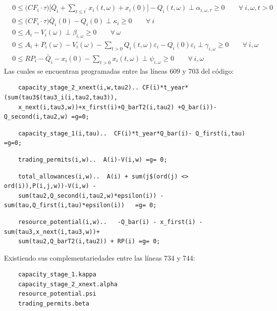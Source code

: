 \footnotesize{
\begin{align}
    & 0 \leq \big(CF_i \cdot \tau \big) \Bigg[\bar{Q}_i + \sum_{t\leq t^{\prime}} x_i(t,\omega) + x_i(0) \Bigg] - Q_i(t,\omega)  \perp \alpha_{i,\omega,\tau} \geq 0 \qquad \forall \ i, \omega, t  > 0\\
    & 0 \leq \Big(CF_i\cdot\tau \Big)\bar{Q}_i(0)-Q_{i}(0) \perp \kappa_i \geq 0 \qquad \forall \ i \\
    & 0 \leq  A_{i} - V_i(\omega) \perp \beta_{i,\omega} \geq 0 \qquad \forall  \ \omega \\
    & 0 \leq  A_{i} + P_{i} (\omega) - V_i(\omega) - \sum_{t>0} Q_i(t,\omega) \varepsilon_{i} -Q_i(0)\varepsilon_{i} \perp \gamma_{i,\omega} \geq 0 \qquad \forall \ i, \omega\\
    & 0 \leq  RP_i - \bar{Q}_i - x_i(0) - \sum_{t>0} x_i(t,\omega) \perp \psi_{i,\omega} \geq 0 \qquad \forall \ i,\omega 
\end{align}
}
Las cuales se encuentran programadas entre las líneas 609 y 703 del código:

\begin{verbatim}
    capacity_stage_2_xnext(i,w,tau2).. CF(i)*t_year*(sum(tau3$(tau3_i(i,tau2,tau3)),
    x_next(i,tau3,w))+x_first(i)+Q_barT2(i,tau2) +Q_bar(i))-Q_second(i,tau2,w) =g=0;
\end{verbatim}
\begin{verbatim}
    capacity_stage_1(i,tau)..  CF(i)*t_year*Q_bar(i)- Q_first(i,tau) =g=0;
\end{verbatim}
\begin{verbatim}
    trading_permits(i,w)..  A(i)-V(i,w) =g= 0;
\end{verbatim}
\begin{verbatim}
    total_allowances(i,w)..  A(i) + sum(j$(ord(j) <> ord(i)),P(i,j,w))-V(i,w) - 
    sum(tau2,Q_second(i,tau2,w)*epsilon(i)) - sum(tau,Q_first(i,tau)*epsilon(i))   =g= 0;
\end{verbatim}
\begin{verbatim}
    resource_potential(i,w)..   -Q_bar(i) - x_first(i) - sum(tau3,x_next(i,tau3,w))+
    sum(tau2,Q_barT2(i,tau2)) + RP(i) =g= 0;
\end{verbatim}

Existiendo sus complementariedades entre las líneas 734 y 744:

\begin{verbatim}
    capacity_stage_1.kappa
    capacity_stage_2_xnext.alpha
    resource_potential.psi
    trading_permits.beta
\end{verbatim}

